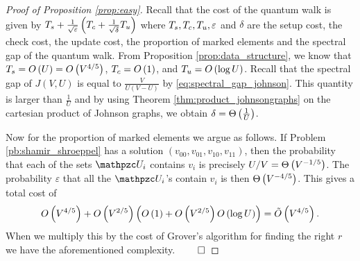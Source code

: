 \begin{proof} [Proof of Proposition \ref{prop:easy}]
Recall that 
the cost of the quantum walk is given by
$
T_s + \frac{1}{\sqrt\varepsilon}\left(T_c + \frac{1}{\sqrt\delta}T_u\right)$
 where $T_s,T_c,T_u,\varepsilon$ and $\delta$
are the setup cost, the check cost, the update cost, the proportion of marked elements
and the spectral gap of the quantum walk. 
From Proposition \ref{prop:data_structure}, we know that
$T_s =  O\left( U \right) = O\left( V^{4/5} \right)$, $T_c  =  O\left( 1 \right)$,
and $T_u  =  O\left( \log U \right)$.
Recall that the spectral gap of $J(V,U)$ is equal to $\frac{V}{U(V-U)}$ by \eqref{eq:spectral_gap_johnson}.
This quantity is larger than $\frac{1}{U}$ and by using  
 Theorem \ref{thm:product_johnsongraphs} on the cartesian product of Johnson graphs, we obtain
$\delta = \Theta\left( \frac{1}{U} \right)$.

Now for the proportion of marked elements we argue as follows. If Problem \ref{pb:shamir_shroeppel} has a solution $(v_{00},v_{01},v_{10},v_{11})$, then the probability that 
each of the sets $\zU_i$ contains $v_i$ is precisely $U/V=\Theta\left( V^{-1/5} \right)$.
The probability $\varepsilon$ that all the $\zU_i$'s contain $v_i$ is then 
$\Theta\left( V^{-4/5} \right)$.  
This gives a total cost of 
$$
O\left( V^{4/5} \right) + O\left( V^{2/5} \right)\left( O\left( 1 \right) + O\left( V^{2/5} \right)O\left( \log U \right)\right) = \tilde{O}\left( V^{4/5} \right).
$$
When we multiply this by the cost of Grover's algorithm for finding the right $r$ we have the aforementioned complexity.$~\qed$
\end{proof}

